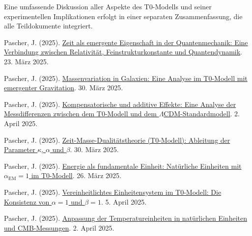 \documentclass[12pt,a4paper]{article}
\newcommand{\alphaEM}{\alpha_{\text{EM}}}
\begin{document}
	Eine umfassende Diskussion aller Aspekte des T0-Modells und seiner experimentellen Implikationen erfolgt in einer separaten Zusammenfassung, die alle Teildokumente integriert.
\begin{thebibliography}{9}
	 Pascher, J. (2025). \href{https://github.com/jpascher/T0-Time-Mass-Duality/tree/main/2/pdf/Deutsch/Zeit als emergente Eigenschaft in der Quantenmechanik.pdf}{Zeit als emergente Eigenschaft in der Quantenmechanik: Eine Verbindung zwischen Relativität, Feinstrukturkonstante und Quantendynamik}. 23. März 2025.
	
	 Pascher, J. (2025). \href{https://github.com/jpascher/T0-Time-Mass-Duality/tree/main/2/pdf/Deutsch/Massenvariation in Galaxien.pdf}{Massenvariation in Galaxien: Eine Analyse im T0-Modell mit emergenter Gravitation}. 30. März 2025.
	
	 Pascher, J. (2025). \href{https://github.com/jpascher/T0-Time-Mass-Duality/tree/main/2/pdf/Deutsch/Analyse der Messdifferenzen zwischen dem T0-Modell und dem Standardmodell.pdf}{Kompensatorische und additive Effekte: Eine Analyse der Messdifferenzen zwischen dem T0-Modell und dem \(\Lambda\)CDM-Standardmodell}. 2. April 2025.
	
	 Pascher, J. (2025). \href{https://github.com/jpascher/T0-Time-Mass-Duality/tree/main/2/pdf/Deutsch/Zeit-Masse-Dualitätstheorie (T0-Modell) Herleitung der Parameter kappa, alpha und beta.pdf}{Zeit-Masse-Dualitätstheorie (T0-Modell): Ableitung der Parameter \(\kappa\), \(\alpha\) und \(\beta\)}. 30. März 2025.
	
	 Pascher, J. (2025). \href{https://github.com/jpascher/T0-Time-Mass-Duality/tree/main/2/pdf/Deutsch/Natürliche Einheiten mit Feinstrukturkonstante alpha = 1.pdf}{Energie als fundamentale Einheit: Natürliche Einheiten mit \(\alphaEM = 1\) im T0-Modell}. 26. März 2025.
	
	 Pascher, J. (2025). \href{https://github.com/jpascher/T0-Time-Mass-Duality/tree/main/2/pdf/Deutsch/Die Konsistenz von alpha = 1 und beta = 1.pdf}{Vereinheitlichtes Einheitensystem im T0-Modell: Die Konsistenz von \(\alpha = 1\) und \(\beta = 1\)}. 5. April 2025.
	
	 Pascher, J. (2025). \href{https://github.com/jpascher/T0-Time-Mass-Duality/tree/main/2/pdf/Deutsch/Anpassung von Temperatureinheiten in natürlichen Einheiten und CMB-Messungen.pdf}{Anpassung der Temperatureinheiten in natürlichen Einheiten und CMB-Messungen}. 2. April 2025.
	

\end{thebibliography}
\end{document}
